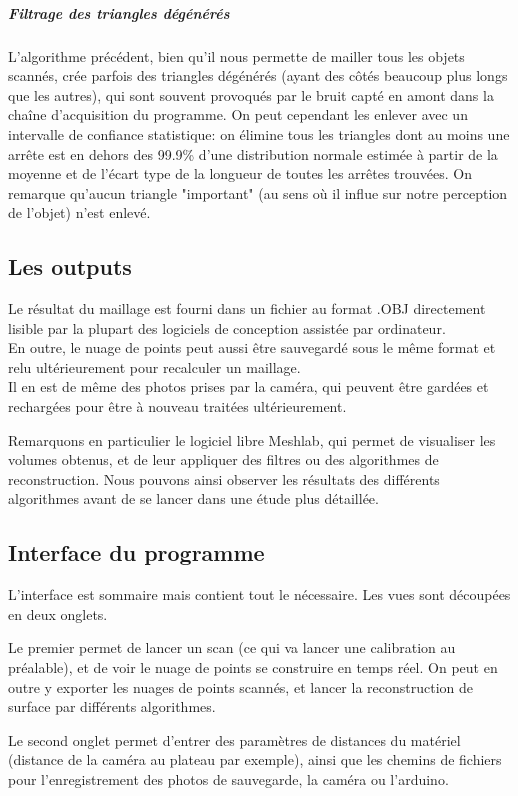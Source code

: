 \documentclass[a4paper,10pt]{report}
\begin{document}
\subparagraph{Filtrage des triangles dégénérés}
L'algorithme précédent, bien qu'il nous permette de mailler tous les objets scannés, crée parfois des triangles dégénérés (ayant des côtés beaucoup plus longs que les autres), qui sont souvent provoqués par le bruit capté en amont dans la chaîne d'acquisition du programme. On peut cependant les enlever avec un intervalle de confiance statistique: on élimine tous les triangles dont au moins une arrête est en dehors des 99.9\% d'une distribution normale estimée à partir de la moyenne et de l'écart type de la longueur de toutes les arrêtes trouvées. On remarque qu'aucun triangle "important" (au sens où il influe sur notre perception de l'objet) n'est enlevé.


\subsection{Les outputs}
Le résultat du maillage est fourni dans un fichier au format .OBJ directement lisible par la plupart des logiciels de conception assistée par ordinateur.\\
En outre, le nuage de points peut aussi être sauvegardé sous le même format et relu ultérieurement pour recalculer un maillage.\\
Il en est de même des photos prises par la caméra, qui peuvent être gardées et rechargées pour être à nouveau traitées ultérieurement.

Remarquons en particulier le logiciel libre Meshlab\cite{meshlab}, qui permet de visualiser les volumes obtenus, et de leur appliquer des filtres ou des algorithmes de reconstruction. Nous pouvons ainsi observer les résultats des différents algorithmes avant de se lancer dans une étude plus détaillée.

\subsection{Interface du programme}

L'interface est sommaire mais contient tout le nécessaire. Les vues sont découpées en deux onglets. 

Le premier permet de lancer un scan (ce qui va lancer une calibration au préalable), et de voir le nuage de points se construire en temps réel. On peut en outre y exporter les nuages de points scannés, et lancer la reconstruction de surface par différents algorithmes.

Le second onglet permet d'entrer des paramètres de distances du matériel (distance de la caméra au plateau par exemple), ainsi que les chemins de fichiers pour l'enregistrement des photos de sauvegarde, la caméra ou l'arduino.
\end{document}
